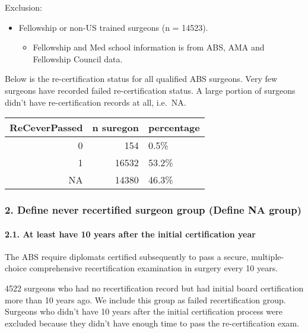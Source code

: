 \documentclass[
]{article}
\providecommand{\tightlist}{%
  \setlength{\itemsep}{0pt}\setlength{\parskip}{0pt}}
\begin{document}
Exclusion:

\begin{itemize}
\tightlist
\item
  Fellowship or non-US trained surgeons (n = 14523).

  \begin{itemize}
  \tightlist
  \item
    Fellowship and Med school information is from ABS, AMA and
    Fellowship Council data.
  \end{itemize}
\end{itemize}

Below is the re-certification status for all qualified ABS surgeons.
Very few surgeons have recorded failed re-certification status. A large
portion of surgeons didn't have re-certification records at all,
i.e.~NA.

\begin{table}[H]
\centering
\begin{tabular}{r|r|l}
\hline
ReCeverPassed & n suregon & percentage\\
\hline
0 & 154 & 0.5\%\\
\hline
1 & 16532 & 53.2\%\\
\hline
NA & 14380 & 46.3\%\\
\hline
\end{tabular}
\end{table}

\hypertarget{define-never-recertified-surgeon-group-define-na-group}{%
\subsubsection{2. Define never recertified surgeon group (Define NA
group)}\label{define-never-recertified-surgeon-group-define-na-group}}

\hypertarget{at-least-have-10-years-after-the-initial-certification-year}{%
\paragraph{2.1. At least have 10 years after the initial certification
year}\label{at-least-have-10-years-after-the-initial-certification-year}}

The ABS require diplomats certified subsequently to pass a secure,
multiple-choice comprehensive recertification examination in surgery
every 10 years.

4522 surgeons who had no recertification record but had initial board
certification more than 10 years ago. We include this group as failed
recertification group. Surgeons who didn't have 10 years after the
initial certification process were excluded because they didn't have
enough time to pass the re-certification exam.
\end{document}
